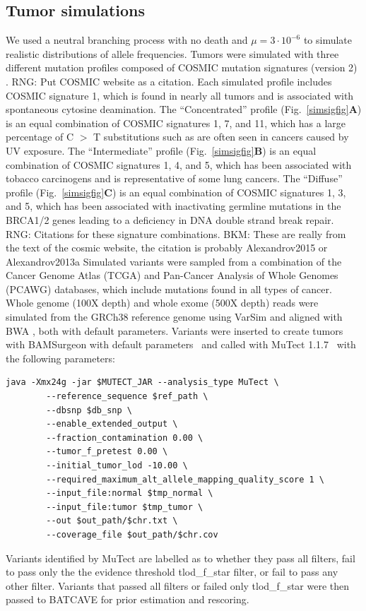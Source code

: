 \documentclass[a4,center,fleqn]{NAR}
\newcommand{\rngcomment}[1]{{\color{red}RNG: #1}}
\newcommand{\bkmcomment}[1]{{\color{blue}BKM: #1}}
\newcommand{\batcave}{BATCAVE }
\begin{document}
\subsection{Tumor simulations}
We used a neutral branching process with no death and $\mu=3\cdot10^{-6}$ to simulate realistic distributions of allele frequencies.
Tumors were simulated with three different mutation profiles composed of COSMIC mutation signatures (version 2) \cite{XXX}.
\rngcomment{Put COSMIC website as a citation.}
Each simulated profile includes COSMIC signature 1, which is found in nearly all tumors and is associated with spontaneous cytosine deamination.
The ``Concentrated'' profile (Fig.~\ref{simsigfig}\textbf{A}) is an equal combination of COSMIC signatures 1, 7, and 11, which has a large percentage of C $>$ T substitutions such as are often seen in cancers caused by UV exposure.
The ``Intermediate'' profile (Fig.~\ref{simsigfig}\textbf{B}) is an equal combination of COSMIC signatures 1, 4, and 5, which has been associated with tobacco carcinogens and is representative of some lung cancers.
The ``Diffuse'' profile (Fig.~\ref{simsigfig}\textbf{C}) is an equal combination of COSMIC signatures 1, 3, and 5, which has been associated with inactivating germline mutations in the BRCA1/2 genes leading to a deficiency in DNA double strand break repair. \rngcomment{Citations for these signature combinations.}
\bkmcomment{These are really from the text of the cosmic website, the citation is probably Alexandrov2015 or Alexandrov2013a}
Simulated variants were sampled from a combination of the Cancer Genome Atlas (TCGA) and Pan-Cancer Analysis of Whole Genomes (PCAWG) databases, which include mutations found in all types of cancer.
Whole genome (100X depth) and whole exome (500X depth) reads were simulated from the GRCh38 reference genome using VarSim \cite{Mu2015} and aligned with BWA \cite{Li2009a}, both with default parameters.
Variants were inserted to create tumors with BAMSurgeon with default parameters~\citep{Ewing2015a} and called with MuTect 1.1.7~\cite{Cibulskis2013} with the following parameters:
\begin{scriptsize}
\begin{verbatim}
java -Xmx24g -jar $MUTECT_JAR --analysis_type MuTect \
        --reference_sequence $ref_path \
        --dbsnp $db_snp \
        --enable_extended_output \
        --fraction_contamination 0.00 \
        --tumor_f_pretest 0.00 \
        --initial_tumor_lod -10.00 \
        --required_maximum_alt_allele_mapping_quality_score 1 \
        --input_file:normal $tmp_normal \
        --input_file:tumor $tmp_tumor \
        --out $out_path/$chr.txt \
        --coverage_file $out_path/$chr.cov
\end{verbatim}
\end{scriptsize}
Variants identified by MuTect are labelled as to whether they pass all filters, fail to pass only the the evidence threshold \textrm{tlod\_f\_star} filter, or fail to pass any other filter. 
Variants that passed all filters or failed only \textrm{tlod\_f\_star} were then passed to \batcave for prior estimation and rescoring.
\end{document}
